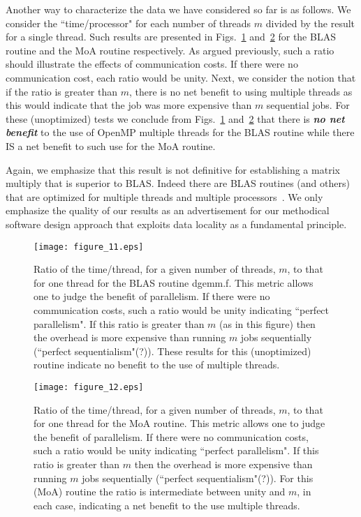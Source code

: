 \documentclass[aps,prl,twocolumn,groupedaddress,floatfix]{revtex4}
\begin{document}
Another way to characterize the data we have considered so far is as 
follows.  We consider the ``time/processor" for each number of threads
$m$ divided by the result for a single thread.  Such results are
presented in Figs.~\ref{fig10} and~\ref{fig11} for the BLAS routine
and the MoA routine respectively.  As argued previously, such a ratio
should illustrate the effects of communication costs.  If there were
no communication cost, each ratio would be unity.  Next, we consider
the notion that if the ratio is greater than $m$, there is no net benefit
to using multiple threads as this would indicate that the job was more
expensive than $m$ sequential jobs.  For these (unoptimized) tests we
conclude from Figs.~\ref{fig10} and~\ref{fig11} that there is {\bf \em
 no net benefit} to the use of OpenMP multiple threads for the BLAS
routine while there IS a net benefit to such use for the MoA routine.

Again, we emphasize that this result is not definitive for establishing
a matrix multiply that is superior to BLAS.  Indeed there are BLAS routines
(and others) that are optimized for multiple threads and multiple 
processors~\cite{addison,bentz05,santos03,bernsten89,chaterjee99,cherkassky88,
choi94,demmel93,fox87,lederman93a,li01,irony04,vandegeijn97}.  
We only
emphasize the quality of our results as an advertisement for our methodical
software design approach that exploits data locality as a fundamental 
principle.

\begin{figure} 
\texttt{[image: figure\_11.eps]}\caption{\label{fig10} Ratio of the time/thread, for a given number of 
threads, $m$, to that for one thread for the BLAS routine dgemm.f.  This 
metric allows one to judge the benefit of parallelism.  If there were no 
communication costs, such a ratio would be unity indicating ``perfect 
parallelism".  If this ratio is greater than $m$ (as in this figure) then
the overhead is more expensive than running $m$ jobs sequentially 
(``perfect sequentialism"(?)).  These results for this (unoptimized) routine
indicate no benefit to the use of multiple threads.
}
\end{figure}

\begin{figure} 
\texttt{[image: figure\_12.eps]}\caption{\label{fig11} Ratio of the time/thread, for a given number of threads, 
$m$, to that for one thread for the MoA routine.  This metric allows one to 
judge the benefit of parallelism.  If there were no communication costs, 
such a ratio would be unity indicating ``perfect parallelism".  If this ratio 
is greater than $m$ then the overhead is more expensive than running $m$ 
jobs sequentially (``perfect sequentialism"(?)).  For this (MoA) routine
the ratio is intermediate between unity and $m$, in each case, indicating a 
net benefit to the use multiple threads.
}
\end{figure}
\end{document}
